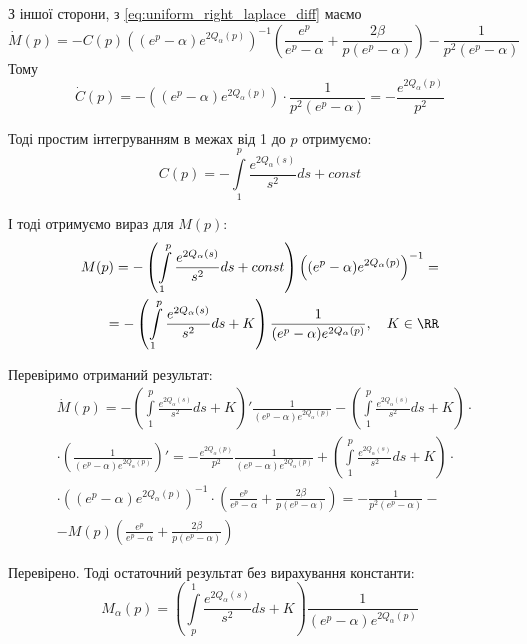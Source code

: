 З іншої сторони, з \eqref{eq:uniform_right_laplace_diff} маємо
$$
	 \dot M(p) = - C(p) \left((e^p - \alpha)  e^{2Q_\alpha(p)}\right)^{-1}  \left(\frac{e^p}{e^p - \alpha} + \frac{2\beta}{p(e^p - \alpha)}\right) - \frac{1}{p^2(e^p - \alpha)} \quad	
$$
Тому
$$
	\dot C(p) = - \left((e^p - \alpha)  e^{2Q_\alpha(p)}\right) \cdot  \frac{1}{p^2(e^p - \alpha)} =  - \frac{e^{2Q_\alpha(p)}}{p^2}
$$

Тоді простим інтегруванням в межах від 1 до $p$ отримуємо:
\begin{equation}
	C(p) = -  \int\limits_1^p \frac{e^{2Q_\alpha(s)}}{s^2} ds + const
\end{equation}

І тоді отримуємо вираз для $M(p)$:
\begin{equation}
\begin{split}
	M(p)=- \left( \int\limits_1^p \frac{e^{2Q_\alpha(s)}}{s^2} ds + const \right) \left((e^p - \alpha)  e^{2Q_\alpha(p)}\right)^{-1}  =\\
	= - \left( \int\limits_1^p \frac{e^{2Q_\alpha(s)}}{s^2} ds + K \right) \frac{1}{(e^p - \alpha)  e^{2Q_\alpha(p)}}, \quad K \in \RR
\end{split}
\end{equation}

Перевіримо отриманий результат:
\begin{equation*}
\begin{split}
	&\dot M(p) = -\left( \int\limits_1^p \frac{e^{2Q_\alpha(s)}}{s^2} ds + K \right)' \frac{1}{(e^p - \alpha)  e^{2Q_\alpha(p)}} -\left( \int\limits_1^p \frac{e^{2Q_\alpha(s)}}{s^2} ds + K \right)\cdot \\ 
	&\cdot \left(\frac{1}{(e^p - \alpha)  e^{2Q_\alpha(p)}}\right)' = -\frac{e^{2Q_\alpha(p)}}{p^2} \frac{1}{(e^p - \alpha)  e^{2Q_\alpha(p)}}  + \left( \int\limits_1^p \frac{e^{2Q_\alpha(s)}}{s^2} ds + K \right) \cdot \\
	& \cdot \left((e^p - \alpha)  e^{2Q_\alpha(p)}\right)^{-1} \cdot \left(\frac{e^p}{e^p - \alpha}  + \frac{2\beta}{p(e^p - \alpha)}   \right)= -\frac{1}{p^2(e^p - \alpha)} -\\
	&- M(p)\left(\frac{e^p}{e^p - \alpha}  + \frac{2\beta}{p(e^p - \alpha)}   \right)
\end{split}
\end{equation*}

Перевірено. Тоді остаточний результат без вирахування константи:
\begin{equation}
	\label{eq:uniform_right_laplace_sol_initial}
	M_\alpha(p)= \left( \int\limits_p^1 \frac{e^{2Q_\alpha(s)}}{s^2} ds + K \right) \frac{1}{(e^p - \alpha)  e^{2Q_\alpha(p)}}
\end{equation}

